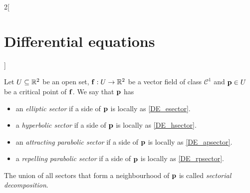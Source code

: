 \documentclass[../../../main_math.tex]{subfiles}
\begin{document}
\begin{multicols}{2}[\section{Differential equations}]
\begin{definition}
  \end{definition}
  \begin{center}
    \begin{minipage}{\linewidth}
      \centering
      
    \end{minipage}
  \end{center}
  \begin{definition}
    Let $U\subseteq \mathbb{R}^2$ be an open set, $\boldsymbol{\mathrm{f}}:U\rightarrow\mathbb{R}^2$ be a vector field of class $\mathcal{C}^1$ and $\boldsymbol{\mathrm{p}}\in U$ be a critical point of $\boldsymbol{\mathrm{f}}$. We say that $\boldsymbol{\mathrm{p}}$ has
    \begin{itemize}
      \item an \emph{elliptic sector} if a side of $\boldsymbol{\mathrm{p}}$ is locally as \cref{DE_esector}.
      \item a \emph{hyperbolic sector} if a side of $\boldsymbol{\mathrm{p}}$ is locally as \cref{DE_hsector}.
      \item  an \emph{attracting parabolic sector} if a side of $\boldsymbol{\mathrm{p}}$ is locally as \cref{DE_apsector}.
      \item a \emph{repelling parabolic sector} if a side of $\boldsymbol{\mathrm{p}}$ is locally as \cref{DE_rpsector}.
    \end{itemize}
    The union of all sectors that form a neighbourhood of $\boldsymbol{\mathrm{p}}$ is called \emph{sectorial decomposition}.
    \begin{center}
      \begin{minipage}[b]{0.475\linewidth}
        \centering
        
        \label{DE_esector}
      \end{minipage}\hfill
      \begin{minipage}[b]{0.475\linewidth}
        \centering
        
        \label{DE_hsector}
      \end{minipage}
    \end{center}
    \begin{center}
      \begin{minipage}[b]{0.475\linewidth}
        \centering
        

\end{minipage}
\end{center}
\end{definition}
\end{multicols}
\end{document}
